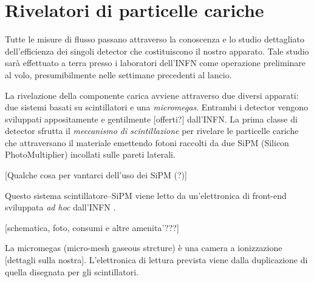 \section{Rivelatori di particelle cariche}

Tutte le misure di flusso passano attraverso la conoscenza e lo studio dettagliato dell'efficienza dei singoli detector che costituiscono il nostro apparato. Tale studio sarà effettuato a terra presso i laboratori dell'INFN come operazione preliminare al volo, presumibilmente nelle settimane precedenti al lancio. 

La rivelazione della componente carica avviene attraverso due diversi apparati: due sistemi basati su scintillatori e una \emph{micromegas}. Entrambi i detector vengono sviluppati appositamente e gentilmente [offerti?] dall'INFN. La prima classe di detector sfrutta il \emph{meccanismo di scintillazione} per rivelare le particelle cariche che attraversano il materiale emettendo fotoni raccolti da due SiPM (Silicon PhotoMultiplier) incollati sulle pareti laterali. 

[Qualche cosa per vantarci dell'uso dei SiPM (?)]

Questo sistema scintillatore--SiPM viene letto da un'elettronica di front-end sviluppata \emph{ad hoc} dall'INFN . 

[schematica, foto, consumi e altre amenita'???]

La micromegas (micro-mesh gaseous strcture) è una camera a ionizzazione [dettagli sulla nostra]. L'elettronica di lettura prevista viene dalla duplicazione di quella disegnata per gli scintillatori. 

